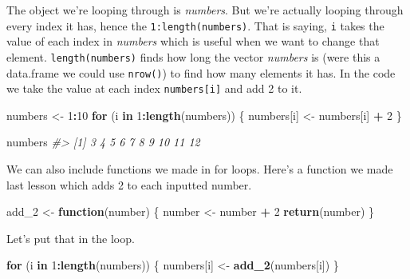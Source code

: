 \documentclass[
  12pt,
]{book}
\newenvironment{Shaded}{\begin{snugshade}}{\end{snugshade}}
\newcommand{\CommentTok}[1]{\textcolor[rgb]{0.56,0.35,0.01}{\textit{#1}}}
\newcommand{\ControlFlowTok}[1]{\textcolor[rgb]{0.13,0.29,0.53}{\textbf{#1}}}
\newcommand{\DecValTok}[1]{\textcolor[rgb]{0.00,0.00,0.81}{#1}}
\newcommand{\KeywordTok}[1]{\textcolor[rgb]{0.13,0.29,0.53}{\textbf{#1}}}
\newcommand{\NormalTok}[1]{#1}
\newcommand{\OperatorTok}[1]{\textcolor[rgb]{0.81,0.36,0.00}{\textbf{#1}}}
\newcommand{\StringTok}[1]{\textcolor[rgb]{0.31,0.60,0.02}{#1}}
\begin{document}
The object we're looping through is \emph{numbers}. But we're actually looping through every index it has, hence the \texttt{1:length(numbers)}. That is saying, \texttt{i} takes the value of each index in \emph{numbers} which is useful when we want to change that element. \texttt{length(numbers)} finds how long the vector \emph{numbers} is (were this a data.frame we could use \texttt{nrow()}) to find how many elements it has. In the code we take the value at each index \texttt{numbers{[}i{]}} and add 2 to it.

\begin{Shaded}
\begin{Highlighting}[]
\NormalTok{numbers <{-}}\StringTok{ }\DecValTok{1}\OperatorTok{:}\DecValTok{10}
\ControlFlowTok{for}\NormalTok{ (i }\ControlFlowTok{in} \DecValTok{1}\OperatorTok{:}\KeywordTok{length}\NormalTok{(numbers)) \{}
\NormalTok{  numbers[i] <{-}}\StringTok{ }\NormalTok{numbers[i] }\OperatorTok{+}\StringTok{ }\DecValTok{2}
\NormalTok{\}}
\end{Highlighting}
\end{Shaded}

\begin{Shaded}
\begin{Highlighting}[]
\NormalTok{numbers}
\CommentTok{\#>  [1]  3  4  5  6  7  8  9 10 11 12}
\end{Highlighting}
\end{Shaded}

We can also include functions we made in for loops. Here's a function we made last lesson which adds 2 to each inputted number.

\begin{Shaded}
\begin{Highlighting}[]
\NormalTok{add\_}\DecValTok{2}\NormalTok{ <{-}}\StringTok{ }\ControlFlowTok{function}\NormalTok{(number) \{}
\NormalTok{  number <{-}}\StringTok{ }\NormalTok{number }\OperatorTok{+}\StringTok{ }\DecValTok{2}
  \KeywordTok{return}\NormalTok{(number)}
\NormalTok{\}}
\end{Highlighting}
\end{Shaded}

Let's put that in the loop.

\begin{Shaded}
\begin{Highlighting}[]
\ControlFlowTok{for}\NormalTok{ (i }\ControlFlowTok{in} \DecValTok{1}\OperatorTok{:}\KeywordTok{length}\NormalTok{(numbers)) \{}
\NormalTok{  numbers[i] <{-}}\StringTok{ }\KeywordTok{add\_2}\NormalTok{(numbers[i])}
\NormalTok{\}}
\end{Highlighting}
\end{Shaded}
\end{document}
